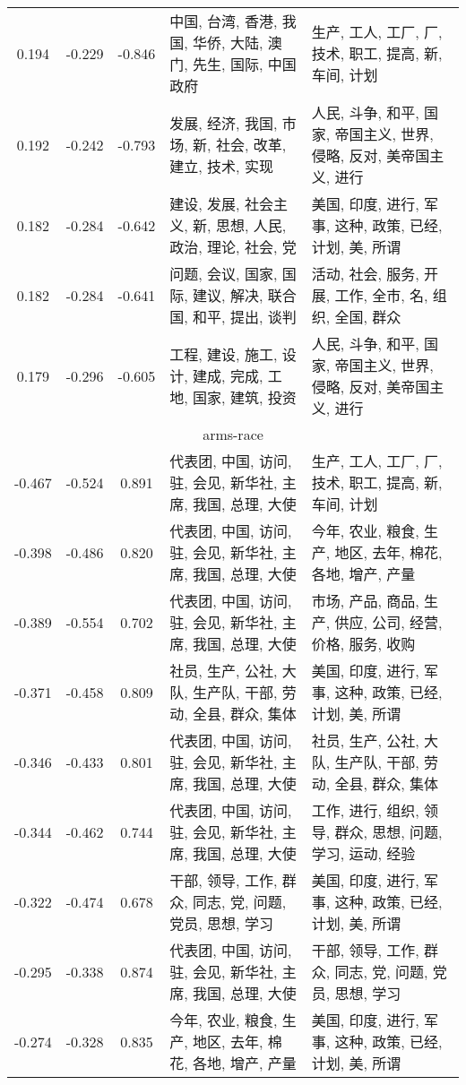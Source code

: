 \begin{tabular}{cccp{5cm}p{5cm}}
0.194 & -0.229 & -0.846 & 中国, 台湾, 香港, 我国, 华侨, 大陆, 澳门, 先生, 国际, 中国政府 & 生产, 工人, 工厂, 厂, 技术, 职工, 提高, 新, 车间, 计划 \\
0.192 & -0.242 & -0.793 & 发展, 经济, 我国, 市场, 新, 社会, 改革, 建立, 技术, 实现 & 人民, 斗争, 和平, 国家, 帝国主义, 世界, 侵略, 反对, 美帝国主义, 进行 \\
0.182 & -0.284 & -0.642 & 建设, 发展, 社会主义, 新, 思想, 人民, 政治, 理论, 社会, 党 & 美国, 印度, 进行, 军事, 这种, 政策, 已经, 计划, 美, 所谓 \\
0.182 & -0.284 & -0.641 & 问题, 会议, 国家, 国际, 建议, 解决, 联合国, 和平, 提出, 谈判 & 活动, 社会, 服务, 开展, 工作, 全市, 名, 组织, 全国, 群众 \\
0.179 & -0.296 & -0.605 & 工程, 建设, 施工, 设计, 建成, 完成, 工地, 国家, 建筑, 投资 & 人民, 斗争, 和平, 国家, 帝国主义, 世界, 侵略, 反对, 美帝国主义, 进行 \\
\midrule
\multicolumn{5}{c}{arms-race}\\
-0.467 & -0.524 & 0.891 & 代表团, 中国, 访问, 驻, 会见, 新华社, 主席, 我国, 总理, 大使 & 生产, 工人, 工厂, 厂, 技术, 职工, 提高, 新, 车间, 计划 \\
-0.398 & -0.486 & 0.820 & 代表团, 中国, 访问, 驻, 会见, 新华社, 主席, 我国, 总理, 大使 & 今年, 农业, 粮食, 生产, 地区, 去年, 棉花, 各地, 增产, 产量 \\
-0.389 & -0.554 & 0.702 & 代表团, 中国, 访问, 驻, 会见, 新华社, 主席, 我国, 总理, 大使 & 市场, 产品, 商品, 生产, 供应, 公司, 经营, 价格, 服务, 收购 \\
-0.371 & -0.458 & 0.809 & 社员, 生产, 公社, 大队, 生产队, 干部, 劳动, 全县, 群众, 集体 & 美国, 印度, 进行, 军事, 这种, 政策, 已经, 计划, 美, 所谓 \\
-0.346 & -0.433 & 0.801 & 代表团, 中国, 访问, 驻, 会见, 新华社, 主席, 我国, 总理, 大使 & 社员, 生产, 公社, 大队, 生产队, 干部, 劳动, 全县, 群众, 集体 \\
-0.344 & -0.462 & 0.744 & 代表团, 中国, 访问, 驻, 会见, 新华社, 主席, 我国, 总理, 大使 & 工作, 进行, 组织, 领导, 群众, 思想, 问题, 学习, 运动, 经验 \\
-0.322 & -0.474 & 0.678 & 干部, 领导, 工作, 群众, 同志, 党, 问题, 党员, 思想, 学习 & 美国, 印度, 进行, 军事, 这种, 政策, 已经, 计划, 美, 所谓 \\
-0.295 & -0.338 & 0.874 & 代表团, 中国, 访问, 驻, 会见, 新华社, 主席, 我国, 总理, 大使 & 干部, 领导, 工作, 群众, 同志, 党, 问题, 党员, 思想, 学习 \\
-0.274 & -0.328 & 0.835 & 今年, 农业, 粮食, 生产, 地区, 去年, 棉花, 各地, 增产, 产量 & 美国, 印度, 进行, 军事, 这种, 政策, 已经, 计划, 美, 所谓 \\

\end{tabular}
